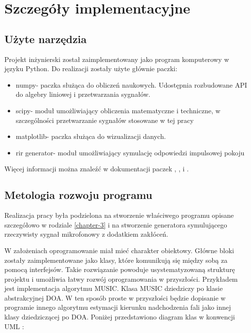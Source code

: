 \chapter{Szczegóły implementacyjne}
\label{chapter-4}

\section{Użyte narzędzia}

\noindent Projekt inżynierski został zaimplementowany jako program komputerowy w języku Python. Do realizacji zostały użyte głównie paczki:

\begin{itemize}
    \item numpy- paczka służąca do obliczeń naukowych. Udostępnia rozbudowane API do algebry liniowej i przetwarzania sygnałów.
    \item scipy- moduł umożliwiający obliczenia matematyczne i techniczne, w szczególności przetwarzanie sygnałów stosowane w tej pracy
    \item matplotlib- paczka służąca do wizualizacji danych.
    \item rir generator- moduł umożliwiający symulację odpowiedzi impulsowej pokoju
\end{itemize}

\noindent Więcej informacji można znaleźć w dokumentacji paczek \cite{numpy}, \cite{matplotlib}, \cite{rir} i \cite{scipy}.

\section{Metologia rozwoju programu}

\noindent Realizacja pracy była podzielona na stworzenie właściwego programu opisane szczegółowo w rodziale \ref{chapter-3} i na stworzenie generatora symulującego rzeczywisty sygnał mikrofonowy z dodatkiem zakłóceń.


W założeniach oprogramowanie miał mieć charakter obiektowy. Główne bloki zostały zaimplementowane jako klasy, które komunikują się między sobą za pomocą interfejsów. Takie rozwiązanie powoduje usystematyzowaną strukturę projektu i umożliwia łatwy rozwój oprogramowania w przyszłości. Przykładem jest implementacja algorytmu MUSIC. Klasa MUSIC dziedziczy po klasie abstrakcyjnej DOA. W ten sposób proste w przyszłości będzie dopisanie w programie innego algorytmu estymacji kierunku nadchodzenia fali jako innej klasy dziedziczącej po DOA. Poniżej przedstawiono diagram klas w konwencji UML \cite{uml}:

